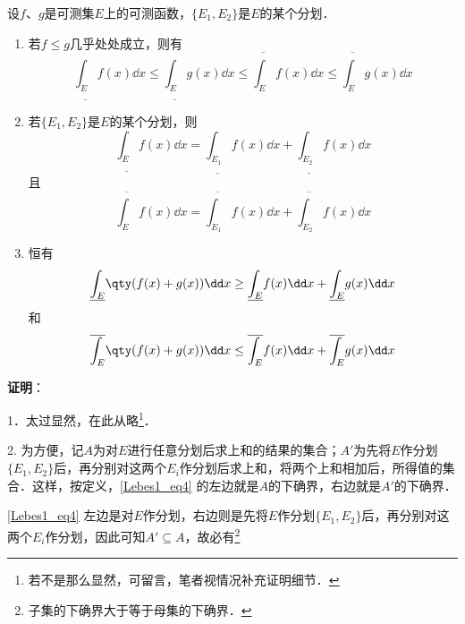 \begin{theorem}{}\label{Lebes1_the1}

设$f$、$g$是可测集$E$上的可测函数，$\{E_1, E_2\}$是$E$的某个分划．

\begin{enumerate}
  \item 若$f\leq g$几乎处处成立，则有
  \begin{equation}
  \underline{\int_E} f(x) \dd x \leq \underline{\int_E} g(x) \dd x \leq \overline{\int_E} f(x) \dd x \leq \overline{\int_E} g(x) \dd x
  \end{equation}
  \item 若$\{E_1, E_2\}$是$E$的某个分划，则
  \begin{equation}\label{Lebes1_eq1}
  \underline{\int_E} f(x) \dd x=\underline{\int_{E_1}} f(x) \dd x+\underline{\int_{E_2}} f(x) \dd x
  \end{equation}
  且
  \begin{equation}\label{Lebes1_eq4}
  \overline{\int_E} f(x) \dd x=\overline{\int_{E_1}} f(x) \dd x+\overline{\int_{E_2}} f(x) \dd x
  \end{equation}
  \item 恒有
  \begin{equation}\label{Lebes1_eq5}
  \underline{\int_E} \qty(f(x)+g(x)) \dd x \geq \underline{\int_E} f(x) \dd x+\underline{\int_E} g(x) \dd x
  \end{equation}
  和
  \begin{equation}\label{Lebes1_eq6}
  \overline{\int_E} \qty(f(x)+g(x)) \dd x \leq \overline{\int_E} f(x) \dd x+\overline{\int_E} g(x) \dd x
  \end{equation}
\end{enumerate}



\end{theorem}

\textbf{证明}：

1．太过显然，在此从略\footnote{若不是那么显然，可留言，笔者视情况补充证明细节．}．

2. 为方便，记$A$为对$E$进行任意分划后求上和的结果的集合；$A'$为先将$E$作分划$\{E_1, E_2\}$后，再分别对这两个$E_i$作分划后求上和，将两个上和相加后，所得值的集合．这样，按定义，\autoref{Lebes1_eq4} 的左边就是$A$的下确界，右边就是$A'$的下确界．

\autoref{Lebes1_eq4} 左边是对$E$作分划，右边则是先将$E$作分划$\{E_1, E_2\}$后，再分别对这两个$E_i$作分划，因此可知$A'\subseteq A$，故必有\footnote{子集的下确界大于等于母集的下确界．}


